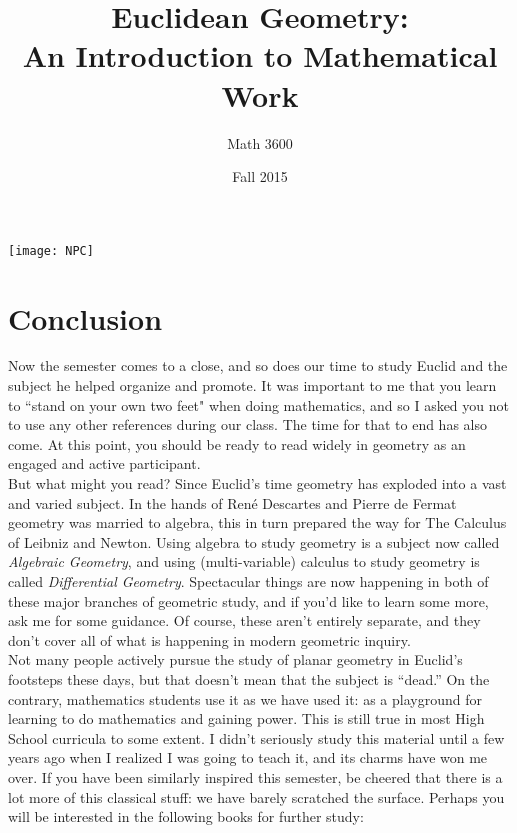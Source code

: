 \documentclass{tufte-handout}
\title{Euclidean Geometry:\\An Introduction to Mathematical Work}
\author[Math 3600]{Math 3600}
\date{Fall 2015}
\theoremstyle{definition}
\begin{document}
\maketitle

\begin{marginfigure}
    \texttt{[image: NPC]}
\end{marginfigure}

\section*{Conclusion}


Now the semester comes to a close, and so does our time to study Euclid and the subject he helped organize and promote. It was important to me that you learn to ``stand on your own two feet" when doing mathematics, and so I asked you not to use any other references during our class. The time for that to end has also come. At this point, you should be ready to read widely in geometry as an engaged and active participant.\\

But what might you read? Since Euclid's time geometry has exploded into a vast and varied subject. 
In the hands of Ren\'{e} Descartes and Pierre de Fermat geometry was married to algebra, this in turn prepared the way for The Calculus of Leibniz and Newton. 
Using algebra to study geometry is a subject now called \emph{Algebraic Geometry}, and using (multi-variable) calculus to study geometry is called \emph{Differential Geometry}.  Spectacular things are now happening in both of these major branches of geometric study, and if you'd like to learn some more, ask me for some guidance. 
Of course, these aren't entirely separate, and they don't cover all of what is happening in modern geometric inquiry.\\

Not many people actively pursue the study of planar geometry in Euclid's footsteps these days, but that doesn't mean that the subject is ``dead.'' On the contrary, mathematics students use it as we have used it: as a playground for learning to do mathematics and gaining power. This is still true in most High School curricula to some extent. I didn't seriously study this material until a few years ago when I realized I was going to teach it, and its charms have won me over. If you have been similarly inspired this semester, be cheered that there is a lot more of this classical stuff: we have barely scratched the surface. Perhaps you will be interested in the following books for further study:
\end{document}
